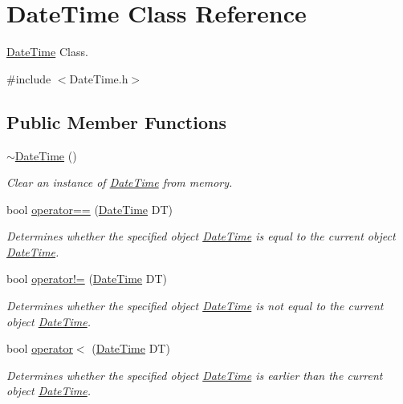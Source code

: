 \hypertarget{class_date_time}{\section{Date\-Time Class Reference}
\label{class_date_time}
}


\hyperlink{class_date_time}{Date\-Time} Class.  




{\ttfamily \#include $<$Date\-Time.\-h$>$}

\subsection*{Public Member Functions}
\begin{DoxyCompactItemize}
\item 
\hyperlink{class_date_time_a5c46d6432c6df5d550603b529e825dc5}{$\sim$\-Date\-Time} ()
\begin{DoxyCompactList}\small\item\em Clear an instance of \hyperlink{class_date_time}{Date\-Time} from memory. \end{DoxyCompactList}\item 
bool \hyperlink{class_date_time_a61752bfcf9bfe5e2e9d493ac42fe3ee8}{operator==} (\hyperlink{class_date_time}{Date\-Time} D\-T)
\begin{DoxyCompactList}\small\item\em Determines whether the specified object \hyperlink{class_date_time}{Date\-Time} is equal to the current object \hyperlink{class_date_time}{Date\-Time}. \end{DoxyCompactList}\item 
bool \hyperlink{class_date_time_a6478a78407126774d91a631dedea5e84}{operator!=} (\hyperlink{class_date_time}{Date\-Time} D\-T)
\begin{DoxyCompactList}\small\item\em Determines whether the specified object \hyperlink{class_date_time}{Date\-Time} is not equal to the current object \hyperlink{class_date_time}{Date\-Time}. \end{DoxyCompactList}\item 
bool \hyperlink{class_date_time_a08f9db72e1d0f49916fe6686218402e8}{operator$<$} (\hyperlink{class_date_time}{Date\-Time} D\-T)
\begin{DoxyCompactList}\small\item\em Determines whether the specified object \hyperlink{class_date_time}{Date\-Time} is earlier than the current object \hyperlink{class_date_time}{Date\-Time}. \end{DoxyCompactList}\item 

\end{DoxyCompactItemize}
